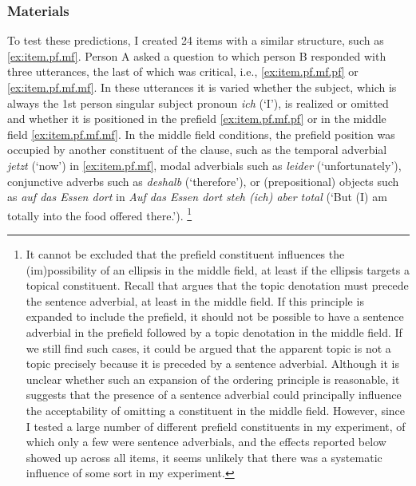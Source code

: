 \subsubsection{Materials}\label{sec:exp.pf.mf.materials}
To test these predictions, I created 24 items with a similar structure, such as \ref{ex:item.pf.mf}.
Person A asked a question to which person B responded with three utterances, the last of which was critical, i.e., \ref{ex:item.pf.mf.pf} or \ref{ex:item.pf.mf.mf}.
In these utterances it is varied whether the subject, which is always the 1st person singular subject pronoun \textit{ich} (`I'), is realized or omitted and whether it is positioned in the prefield \ref{ex:item.pf.mf.pf} or in the middle field \ref{ex:item.pf.mf.mf}.
In the middle field conditions, the prefield position was occupied by another constituent of the clause, such as the temporal adverbial  \textit{jetzt} (`now') in \ref{ex:item.pf.mf}, modal adverbials such as \textit{leider} (`unfortunately'), conjunctive adverbs such as \textit{deshalb} (`therefore'), or (prepositional) objects such as \textit{auf das Essen dort} in \textit{Auf das Essen dort steh (ich) aber total} (`But (I) am totally into the food offered there.').%
\footnote{It cannot be excluded that the prefield constituent influences the (im)possibility of an ellipsis in the middle field, at least if the ellipsis targets a topical constituent.
Recall that \citet{frey2000} argues that the topic denotation must precede the sentence adverbial,  at least in the middle field.
If this principle is expanded to include the prefield, it should not be possible to have a sentence adverbial  in the prefield followed by a topic denotation in the middle field.
If we still find such cases, it could be argued that the apparent topic is not a topic precisely because it is preceded by a sentence adverbial. 
Although it is unclear whether such an expansion of the ordering principle is reasonable, it suggests that the presence of a sentence adverbial could principally influence the acceptability of omitting a constituent in the middle field.
However, since I tested a large number of different prefield constituents in my experiment, of which only a few were sentence adverbials, and the effects reported below showed up across all items, it seems unlikely that there was a systematic influence of some sort in my experiment.
}

